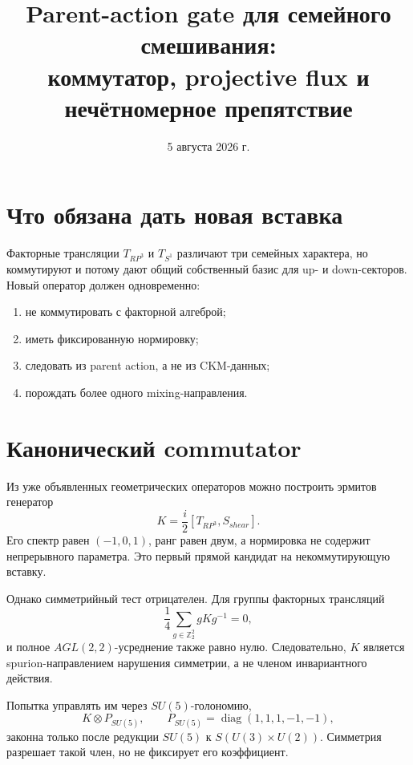 \documentclass[12pt,a4paper]{article}
\title{Parent-action gate для семейного смешивания:\\
коммутатор, projective flux и нечётномерное препятствие}
\author{}
\date{5 августа 2026 г.}
\begin{document}
\maketitle

\section{Что обязана дать новая вставка}

Факторные трансляции $T_{RP^3}$ и $T_{S^1}$ различают три семейных характера,
но коммутируют и потому дают общий собственный базис для up- и down-секторов.
Новый оператор должен одновременно:
\begin{enumerate}
 \item не коммутировать с факторной алгеброй;
 \item иметь фиксированную нормировку;
 \item следовать из parent action, а не из CKM-данных;
 \item порождать более одного mixing-направления.
\end{enumerate}

\section{Канонический commutator}

Из уже объявленных геометрических операторов можно построить эрмитов генератор
\begin{equation}
 K=\frac{i}{2}[T_{RP^3},S_{shear}].
\end{equation}
Его спектр равен $(-1,0,1)$, ранг равен двум, а нормировка не содержит
непрерывного параметра. Это первый прямой кандидат на некоммутирующую вставку.

Однако симметрийный тест отрицателен. Для группы факторных трансляций
\begin{equation}
 \frac14\sum_{g\in\mathbb Z_2^2}gKg^{-1}=0,
\end{equation}
и полное $AGL(2,2)$-усреднение также равно нулю. Следовательно, $K$ является
spurion-направлением нарушения симметрии, а не членом инвариантного действия.

Попытка управлять им через $SU(5)$-голономию,
\begin{equation}
 K\otimes P_{SU(5)},
 \qquad P_{SU(5)}=\operatorname{diag}(1,1,1,-1,-1),
\end{equation}
законна только после редукции $SU(5)$ к $S(U(3)\times U(2))$. Симметрия
разрешает такой член, но не фиксирует его коэффициент.
\end{document}
